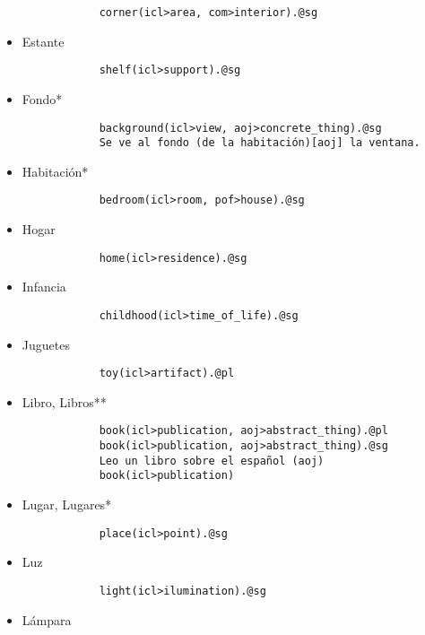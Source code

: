 \documentclass{article}
\begin{document}
\begin{itemize}
        \begin{verbatim}
            corner(icl>area, com>interior).@sg
        \end{verbatim}
        \item Estante
        \begin{verbatim}
            shelf(icl>support).@sg
        \end{verbatim}
        \item Fondo*
        \begin{verbatim}
            background(icl>view, aoj>concrete_thing).@sg
            Se ve al fondo (de la habitación)[aoj] la ventana.
        \end{verbatim}
        \item Habitación*
        \begin{verbatim}
            bedroom(icl>room, pof>house).@sg
        \end{verbatim}
        \item Hogar
        \begin{verbatim}
            home(icl>residence).@sg
        \end{verbatim}
        \item Infancia
        \begin{verbatim}
            childhood(icl>time_of_life).@sg
        \end{verbatim}
        \item Juguetes
        \begin{verbatim}
            toy(icl>artifact).@pl
        \end{verbatim}
        \item Libro, Libros**
        \begin{verbatim}
            book(icl>publication, aoj>abstract_thing).@pl
            book(icl>publication, aoj>abstract_thing).@sg
            Leo un libro sobre el español (aoj)
            book(icl>publication)
        \end{verbatim}
        \item Lugar, Lugares*
        \begin{verbatim}
            place(icl>point).@sg
        \end{verbatim}
        \item Luz
        \begin{verbatim}
            light(icl>ilumination).@sg
        \end{verbatim}
        \item Lámpara
        \begin{verbatim}

\end{verbatim}
\end{itemize}
\end{document}
